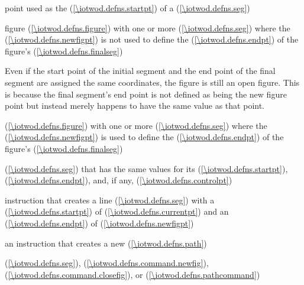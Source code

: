 %
point used as the  (\ref{\iotwod.defns.startpt}) of a  (\ref{\iotwod.defns.seg})

%
figure (\ref{\iotwod.defns.figure}) with one or more  (\ref{\iotwod.defns.seg}) where the  (\ref{\iotwod.defns.newfigpt}) is not used to define the  (\ref{\iotwod.defns.endpt}) of the figure's  (\ref{\iotwod.defns.finalseg})
\begin{note}
Even if the start point of the initial segment and the end point of the final segment are assigned the same coordinates, the figure is still an open figure. This is because the final segment's end point is not defined as being the new figure point but instead merely happens to have the same value as that point.
\end{note}

%
 (\ref{\iotwod.defns.figure}) with one or more  (\ref{\iotwod.defns.seg}) where the  (\ref{\iotwod.defns.newfigpt}) is used to define the  (\ref{\iotwod.defns.endpt}) of the figure's  (\ref{\iotwod.defns.finalseg})

%
 (\ref{\iotwod.defns.seg}) that has the same values for its  (\ref{\iotwod.defns.startpt}),  (\ref{\iotwod.defns.endpt}), and, if any,  (\ref{\iotwod.defns.controlpt})

%
 instruction that creates a line  (\ref{\iotwod.defns.seg}) with a  (\ref{\iotwod.defns.startpt}) of  (\ref{\iotwod.defns.currentpt}) and an  (\ref{\iotwod.defns.endpt}) of  (\ref{\iotwod.defns.newfigpt})

%
 an instruction that creates a new  (\ref{\iotwod.defns.path})

%
 (\ref{\iotwod.defns.seg}),  (\ref{\iotwod.defns.command.newfig}),  (\ref{\iotwod.defns.command.closefig}), or  (\ref{\iotwod.defns.pathcommand})

